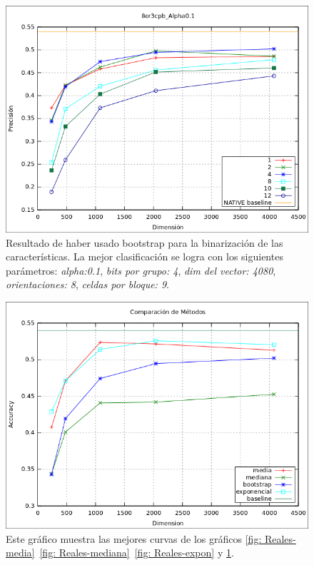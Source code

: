 			\begin{figure}[htbp]
				\centering
				\includegraphics[scale=0.6]{img/resultados/reales/bootstrap.png}
				\caption[Reales con umbral boostrap]{Resultado de haber usado bootstrap para la binarización de las características. La mejor clasificación se logra con los siguientes parámetros: \textit{alpha:0.1}, \textit{bits por grupo: 4}, \textit{dim del vector: 4080}, \textit{orientaciones: 8}, \textit{celdas por bloque: 9}.}
				\label{fig: Reales-bootstrap}
			\end{figure}
			
			\begin{figure}[htbp]
				\centering
				\includegraphics[scale=0.6]{img/resultados/reales/comparativa_metodos.png}
				\caption[Reales - Comparación entre métodos]{Este gráfico muestra las mejores curvas de los gráficos \ref{fig: Reales-media}~\ref{fig: Reales-mediana}~\ref{fig: Reales-expon} y \ref{fig: Reales-bootstrap}.}
				\label{fig: Reales-Comparativa metodos}
			\end{figure}

